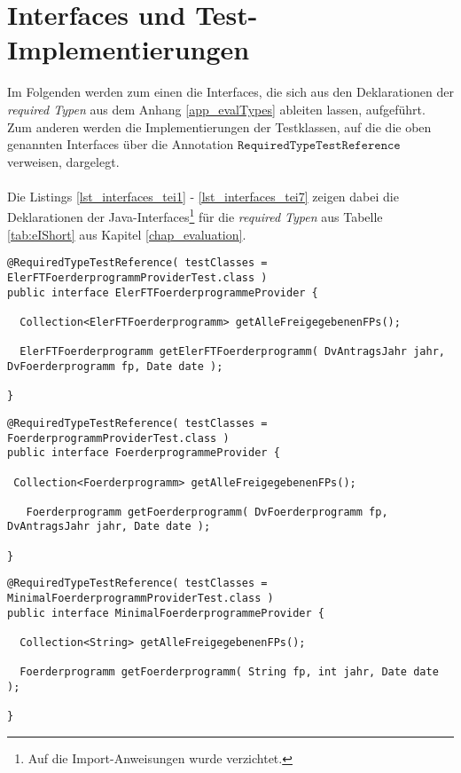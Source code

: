 \chapter{Interfaces und Test-Implementierungen}\label{app_interfacesAndTests}
Im Folgenden werden zum einen die \Gls{Interface}s, die sich aus den Deklarationen der \emph{required Typen} aus dem Anhang \ref{app_evalTypes} ableiten lassen, aufgeführt. Zum anderen werden die Implementierungen der Testklassen, auf die die oben genannten \Gls{Interface}s über die Annotation $\texttt{RequiredTypeTestReference}$ verweisen, dargelegt. 
\\\\
Die Listings \ref{lst_interfaces_tei1} - \ref{lst_interfaces_tei7} zeigen dabei die Deklarationen der Java-Interfaces\footnote{Auf die Import-Anweisungen wurde verzichtet.} für die \emph{required Typen} aus Tabelle \ref{tab:eIShort} aus Kapitel \ref{chap_evaluation}.
\begin{lstlisting}[style = java, caption = Interface ElerFTFoerderprogrammeProvider, captionpos = b, label = lst_interfaces_tei1]
@RequiredTypeTestReference( testClasses = ElerFTFoerderprogrammProviderTest.class )
public interface ElerFTFoerderprogrammeProvider {

  Collection<ElerFTFoerderprogramm> getAlleFreigegebenenFPs();

  ElerFTFoerderprogramm getElerFTFoerderprogramm( DvAntragsJahr jahr, DvFoerderprogramm fp, Date date );
  
}
\end{lstlisting}
\begin{lstlisting}[style = java, caption = Interface FoerderprogrammeProvider, captionpos = b, label = lst_interfaces_tei2]
@RequiredTypeTestReference( testClasses = FoerderprogrammProviderTest.class )
public interface FoerderprogrammeProvider {

 Collection<Foerderprogramm> getAlleFreigegebenenFPs();

   Foerderprogramm getFoerderprogramm( DvFoerderprogramm fp, DvAntragsJahr jahr, Date date );
   
}
\end{lstlisting}
\begin{lstlisting}[style = java, caption = Interface MinimalFoerderprogrammeProvider, captionpos = b, label = lst_interfaces_tei3]
@RequiredTypeTestReference( testClasses = MinimalFoerderprogrammProviderTest.class )
public interface MinimalFoerderprogrammeProvider {

  Collection<String> getAlleFreigegebenenFPs();

  Foerderprogramm getFoerderprogramm( String fp, int jahr, Date date );
  
}
\end{lstlisting}
